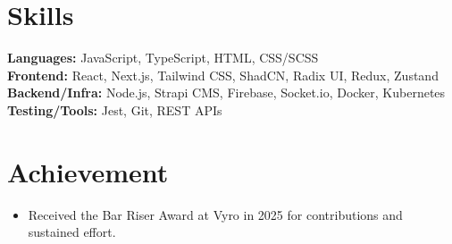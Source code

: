 \documentclass[10pt,letterpaper]{article}
\begin{document}
\section*{Skills}
\textbf{Languages:} JavaScript, TypeScript, HTML, CSS/SCSS \\
\textbf{Frontend:} React, Next.js, Tailwind CSS, ShadCN, Radix UI, Redux, Zustand \\
\textbf{Backend/Infra:} Node.js, Strapi CMS, Firebase, Socket.io, Docker, Kubernetes \\
\textbf{Testing/Tools:} Jest, Git, REST APIs

\section*{Achievement}
\begin{itemize}[leftmargin=*, itemsep=2pt, topsep=2pt]
  \item Received the Bar Riser Award at Vyro in 2025 for contributions and sustained effort.
\end{itemize}
\end{document}
